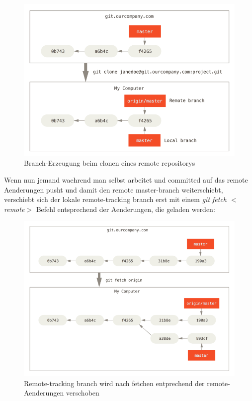 \documentclass{article}
\begin{document}
\begin{figure}[h!]
    \centering
    \includegraphics[width=\textwidth]{../bilder/remote-branches-1.png}
    \caption{Branch-Erzeugung beim clonen eines remote repositorys}
    \label{remoote1}
\end{figure} 

Wenn nun jemand waehrend man selbst arbeitet und committed auf das remote Aenderungen pusht und damit den remote master-branch weiterschiebt, verschiebt sich der lokale remote-tracking branch erst mit einem \textit{git fetch $<$remote$>$} Befehl entsprechend der Aenderungen, die geladen werden:

\begin{figure}[h!]
    \centering
    \includegraphics[width=\textwidth]{../bilder/remote-branches-3.png}
    \caption{Remote-tracking branch wird nach fetchen entprechend der remote-Aenderungen verschoben}
    \label{remoote2}
\end{figure} 
\end{document}
